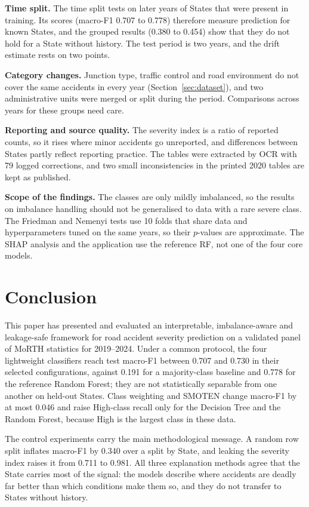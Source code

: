 \documentclass[conference]{IEEEtran}
\begin{document}
\textbf{Time split.} The time split tests on later years of States that were present in training. Its scores (macro-F1 0.707 to 0.778) therefore measure prediction for known States, and the grouped results (0.380 to 0.454) show that they do not hold for a State without history. The test period is two years, and the drift estimate rests on two points.

\textbf{Category changes.} Junction type, traffic control and road environment do not cover the same accidents in every year (Section~\ref{sec:dataset}), and two administrative units were merged or split during the period. Comparisons across years for these groups need care.

\textbf{Reporting and source quality.} The severity index is a ratio of reported counts, so it rises where minor accidents go unreported, and differences between States partly reflect reporting practice. The tables were extracted by OCR with 79 logged corrections, and two small inconsistencies in the printed 2020 tables are kept as published.

\textbf{Scope of the findings.} The classes are only mildly imbalanced, so the results on imbalance handling should not be generalised to data with a rare severe class. The Friedman and Nemenyi tests use 10 folds that share data and hyperparameters tuned on the same years, so their $p$-values are approximate. The SHAP analysis and the application use the reference RF, not one of the four core models.

\section{Conclusion}
\label{sec:conclusion}

This paper has presented and evaluated an interpretable, imbalance-aware and leakage-safe framework for road accident severity prediction on a validated panel of MoRTH statistics for 2019--2024. Under a common protocol, the four lightweight classifiers reach test macro-F1 between 0.707 and 0.730 in their selected configurations, against 0.191 for a majority-class baseline and 0.778 for the reference Random Forest; they are not statistically separable from one another on held-out States. Class weighting and SMOTEN change macro-F1 by at most 0.046 and raise High-class recall only for the Decision Tree and the Random Forest, because High is the largest class in these data.

The control experiments carry the main methodological message. A random row split inflates macro-F1 by 0.340 over a split by State, and leaking the severity index raises it from 0.711 to 0.981. All three explanation methods agree that the State carries most of the signal: the models describe where accidents are deadly far better than which conditions make them so, and they do not transfer to States without history.
\end{document}
